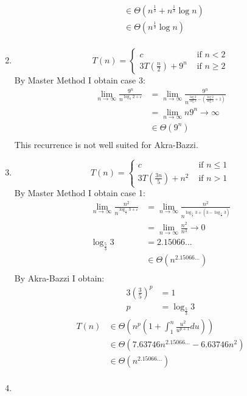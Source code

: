 \documentclass[paper=a4,fontsize=11pt]{article}
\begin{document}
\begin{enumerate}
\begin{align*}
    &\in \Theta(n^{\frac{1}{3}}+n^{\frac{1}{3}}\log{n})\\
    &\in \Theta(n^{\frac{1}{3}}\log{n})\\
\end{align*}
\item
\[
T(n) = \left\{
\begin{array}{cl}
c & \textrm{ if } n < 2\\
3T(\frac{n}{2}) + 9^n & \textrm{ if } n \geq 2
\end{array}
\right.
\]
By Master Method I obtain case 3:
\begin{align*}
    \lim_{n\to\infty}{\frac{9^n}{n^{\log_{3}{2}+\varepsilon}}}&=\lim_{n\to\infty}{\frac{9^n}{n^{\frac{\log{2}}{\log{3}}-(\frac{\log{2}}{\log{3}} + 1)}}}\\
    &=\lim_{n\to\infty}{n9^n}\rightarrow\infty\\
    &\in \Theta(9^n)\\
\end{align*}
This recurrence is not well suited for Akra-Bazzi.
\item
\[
T(n) = \left\{
\begin{array}{cl}
c & \textrm{ if } n \leq 1\\
3T(\frac{3n}{5}) + n^2 & \textrm{ if } n > 1
\end{array}
\right.
\]
By Master Method I obtain case 1:
\begin{align*}
    \lim_{n\to\infty}{\frac{n^2}{n^{\log_{\frac{5}{3}}{3}+\varepsilon}}}&=\lim_{n\to\infty}{\frac{n^2}{n^{\log_{\frac{5}{3}}{3}+(3-\log_{\frac{5}{3}}{3})}}}\\
    &=\lim_{n\to\infty}{\frac{n^2}{n^3}}\rightarrow0\\
    \log_{\frac{5}{3}}{3}&=2.15066...\\
    &\in \Theta(n^{2.15066...})\\
\end{align*}
By Akra-Bazzi I obtain:
\begin{align*}
    3(\frac{3}{5})^{p}&=1\\
    p&=\log_{\frac{5}{3}}{3}
\end{align*}
\begin{align*}
    T(n) &\in \Theta(n^{p}(1+\int_{1}^{n}{\frac{u^{2}}{u^{p+1}}du}))\\
    &\in \Theta(7.63746 n^{2.15066...}-6.63746 n^{2})\\
    &\in \Theta(n^{2.15066...})\\
\end{align*}
\item

\end{enumerate}
\end{document}
